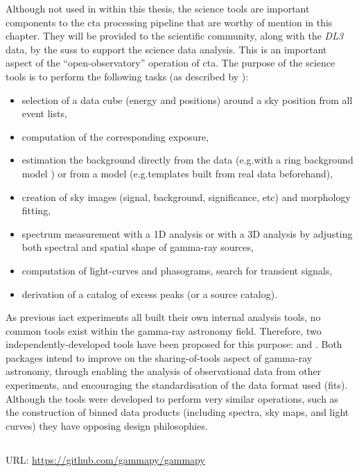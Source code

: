Although not used in within this thesis, the science tools are important components to the \gls{cta} processing pipeline that are worthy of mention in this chapter. They will be provided to the scientific community, along with the \textit{DL3} data, by the \gls{suss} to support the science data analysis. This is an important aspect of the ``open-observatory'' operation of \gls{cta}. The purpose of the science tools is to perform the following tasks (as described by \textcite[p. 4]{Deil2017}):
\begin{itemize}
\item selection of a data cube (energy and positions) around a sky position from all event lists,
\item computation of the corresponding exposure,
\item estimation the background directly from the data (e.g.\@ with a ring background model \cite{Berge2007}) or from a model (e.g.\@ templates built from real data beforehand),
\item creation of sky images (signal, background, significance, etc) and morphology fitting,
\item spectrum measurement with a 1D analysis or with a 3D analysis by adjusting both spectral and spatial shape of gamma-ray sources,
\item computation of light-curves and phasograms, search for transient signals,
\item derivation of a catalog of excess peaks (or a source catalog).
\end{itemize}

As previous \gls{iact} experiments all built their own internal analysis tools, no common tools exist within the gamma-ray astronomy field. Therefore, two independently-developed tools have been proposed for this purpose:  and . Both packages intend to improve on the sharing-of-tools aspect of gamma-ray astronomy, through enabling the analysis of observational data from other experiments, and encouraging the standardisation of the data format used (\gls{fits}). Although the tools were developed to perform very similar operations, such as the construction of binned data products (including spectra, sky maps, and light curves) they have opposing design philosophies.

\subsection{}
\vspace{-0.7em}
\noindent \hspace{\parindent} {\tiny URL: \url{https://github.com/gammapy/gammapy} \par}

